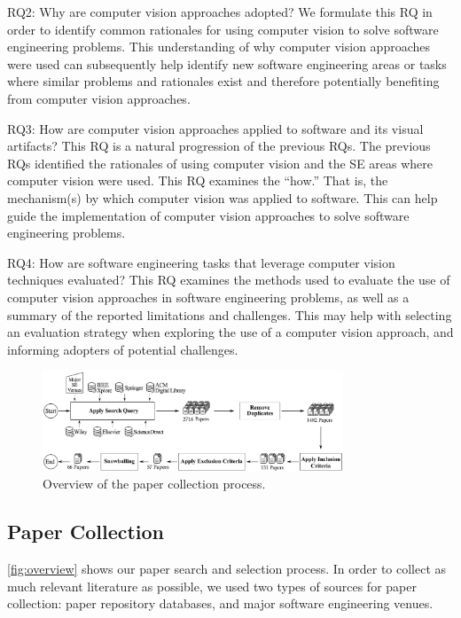 RQ2: Why are computer vision approaches adopted? 
We formulate this RQ in order to identify common rationales 
for using computer vision to solve software engineering problems.
This understanding of why computer vision approaches
were used can subsequently help identify new software engineering
areas or tasks where similar problems and rationales exist
and therefore potentially benefiting from computer vision approaches.

RQ3: How are computer vision approaches applied to software and its visual artifacts? 
This RQ is a natural progression of the previous RQs. 
The previous RQs identified the rationales of using computer vision 
and the SE areas where computer vision were used.
This RQ examines the ``how.''
That is, the mechanism(s) by which computer vision was applied to software.
This can help guide the implementation of computer vision approaches
to solve software engineering problems.

RQ4: How are software engineering tasks that leverage computer vision techniques evaluated? 
This RQ examines the methods used to evaluate the use of computer vision approaches
in software engineering problems, as well as a summary of the reported limitations and challenges.
This may help with selecting an evaluation strategy when exploring the use of a computer vision approach,
and informing adopters of potential challenges.

\begin{figure}
    \centering
    \includegraphics[width=0.80\textwidth]{survey/figures/overview}
    \caption{Overview of the paper collection process. }
    \label{fig:overview}
\end{figure}

\subsection{Paper Collection}\label{sec:collection}

\autoref{fig:overview} shows our paper search and selection process.
In order to collect as much relevant literature as possible, 
we used two types of sources for paper collection: 
paper repository databases, and major software engineering venues.

